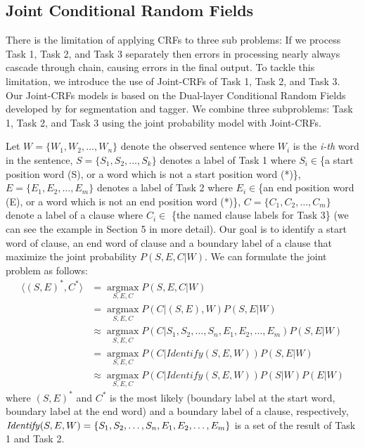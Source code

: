 \documentclass[english]{jnlp_1.4}
\begin{document}
\subsection{Joint Conditional Random Fields}

There is the limitation of applying CRFs to three sub problems: If
we process Task 1, Task 2, and Task 3 separately then errors in
processing nearly always cascade through chain, causing errors in
the final output. To tackle this limitation, we introduce the use
of Joint-CRFs of Task 1, Task 2, and Task 3. Our Joint-CRFs models
is based on the Dual-layer Conditional Random Fields developed by
\cite{Shi2007} for segmentation and tagger. We combine three
subproblems: Task 1, Task 2, and Task 3 using the joint
probability model with Joint-CRFs.

Let $W = \{W_1, W_2, \dots, W_n\}$ denote the observed sentence
where $W_i$ is the \emph{i-th} word in the sentence, $S=\{S_1,S_2,
\dots, S_k\}$ denotes a label of Task 1 where $S_i \in $\{a start
position word (S), or a word which is not a start position word
(*)\}, $E=\{E_1, E_2, \dots, E_m\}$ denotes a label of Task 2
where $E_i \in $\{an end position word (E), or a word which is not
an end position word (*)\}, $C=\{C_1,C_2, \dots, C_m \}$ denote a
label of a clause where $C_i \in$ \{the named clause labels for
Task 3\} (we can see the example in Section 5 in more detail). Our
goal is to identify a start word of clause, an end word of clause
and a boundary label of a clause that maximize the joint
probability $P(S,E,C|W)$. We can formulate the joint problem as
\pagebreak
follows:
\begin{align}
\langle (S,E)^*,C^*\rangle & = \mathop {\arg\max}\limits_{S,E,C}P(S,E,C|W)\nonumber \\
      & = \mathop {\arg \max}\limits_{S,E,C}P(C|(S,E),W)P(S,E|W) \\
      & \approx \mathop {\arg \max}\limits_{S,E,C}P(C|S_1, S_2, \dots, S_n, E_1, E_2, \dots,
      E_m)P(S,E|W) \nonumber \\
      & = \mathop {\arg \max}\limits_{S,E,C}P(C|Identify(S,E,W))P(S,E|W)\\
      & \approx \mathop {\arg \max}\limits_{S,E,C}P(C|Identify(S,E,W))P(S|W)P(E|W)
\end{align}
where $(S,E)^*$ and $C^*$ is the most likely (boundary
label at the start word, boundary label at the end word) and a
boundary label of a clause, respectively, $\mathit{Identify}(S,E,W) =
\{S_1, S_2, \dots, S_n, 
\linebreak
E_1, E_2, \dots, E_m\}$ is a set of the
result of Task 1 and Task 2.
\end{document}
